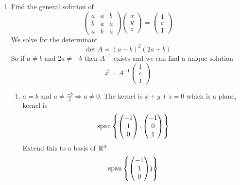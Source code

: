 \documentclass{article}
\numberwithin{equation}{section}
\begin{document}
\begin{eg}
\begin{enumerate}[label=(\arabic*)]
        \item Find the general solution of
        \[
            \begin{pmatrix}
                a & a & b \\
                b & a & a \\
                a & b & a
            \end{pmatrix}
            \begin{pmatrix}
                x \\ y \\ z
            \end{pmatrix}
            =
            \begin{pmatrix}
                1 \\ c \\ 1
            \end{pmatrix}
        \]
        We solve for the determinant
        \[
            \det A = (a - b)^2 (2a + b)
        \]
        So if $a \neq b$ and $2a \neq -b$ then $A^{-1}$ exists and we can find a unique solution
        \[
            \vec x = A^{-1} \begin{pmatrix}
                1 \\ c \\ 1
            \end{pmatrix}
        \]
        \begin{enumerate}
            \item $a = b$ and $a \neq \frac{-b}{2} \Rightarrow a \neq 0$.
            The kernel is $x + y + z = 0$ which is a plane, kernel is
            \[
                \operatorname{span} \left\{ 
                    \begin{pmatrix} 
                        -1 \\ 1 \\ 0
                    \end{pmatrix},
                    \begin{pmatrix} 
                        -1 \\ 0 \\ 1
                    \end{pmatrix}
                 \right\}
            \]
            Extend this to a basis of $\mathbb{R}^3$
            \[
                \operatorname{span} \left\{ 
                    \begin{pmatrix} 
                        -1 \\ 1 \\ 0
                    \end{pmatrix},
                    \begin{pmatrix} 

\end{pmatrix} \right\}\]
\end{enumerate}
\end{enumerate}
\end{eg}
\end{document}
